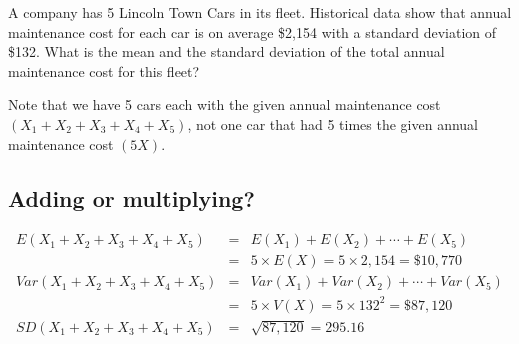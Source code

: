\documentclass[
]{article}
\begin{document}
A company has 5 Lincoln Town Cars in its fleet. Historical data show
that annual maintenance cost for each car is on average \$2,154 with a
standard deviation of \$132. What is the mean and the standard deviation
of the total annual maintenance cost for this fleet?

Note that we have 5 cars each with the given annual maintenance cost
\((X_1 + X_2 + X_3 + X_4 + X_5)\), not one car that had 5 times the
given annual maintenance cost \((5X)\).

\hypertarget{adding-or-multiplying-1}{%
\subsection{Adding or multiplying?}\label{adding-or-multiplying-1}}

\[
\begin{split}
E(X_1 + X_2 + X_3 + X_4 + X_5) &=& E(X_1) + E(X_2) + \cdots + E(X_5) \\
&=& 5 \times E(X) = 5 \times 2,154 = \$ 10,770 \\
Var(X_1 + X_2 + X_3 + X_4 + X_5) &=& Var(X_1) + Var(X_2) + \cdots + Var(X_5) \\
&=& 5 \times V(X) = 5 \times 132^2 = \$ 87,120 \\
SD(X_1 + X_2 + X_3 + X_4 + X_5) &=& \sqrt{87,120} =  295.16
\end{split}
\]
\end{document}
